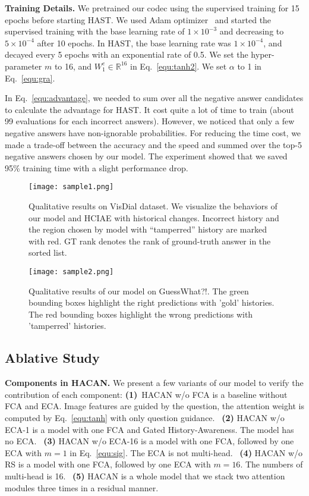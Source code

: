\documentclass[10pt,twocolumn,letterpaper]{article}
\begin{document}
\noindent\textbf{Training Details.} We pretrained our codec using the supervised training for 15 epochs before starting HAST. We used Adam optimizer~\cite{kingma2014adam} and started the supervised training with the base learning rate of $1\!\times\!10^{-3}$ and decreasing to $5\!\times\!10^{-4}$ after 10 epochs. In HAST, the base learning rate was $1\!\times\!10^{-4}$, and decayed every 5 epochs with an exponential rate of 0.5. We set the hyper-parameter $m$ to 16, and $W_{1}^{e} \in \mathbb{R}^{16}$ in Eq.~\eqref{equ:tanh2}. We set $\alpha$ to 1 in Eq.~\eqref{equ:gra}.

In Eq.~\eqref{equ:advantage}, we needed to sum over all the negative answer candidates to calculate the advantage for HAST. It cost quite a lot of time to train (about 99 evaluations for each incorrect answers). However, we noticed that only a few negative answers have non-ignorable probabilities. For reducing the time cost, we made a trade-off between the accuracy and the speed and summed over the top-5 negative answers chosen by our model. The experiment showed that we saved 95\% training time with a slight performance drop.



\begin{figure}[t]
\begin{center}
\texttt{[image: sample1.png]}
\end{center}
   \caption{Qualitative results on VisDial dataset. We visualize the behaviors of our model and HCIAE with historical changes. Incorrect history and the region chosen by model with “tamperred” history are marked with red. GT rank denotes the rank of ground-truth answer in the sorted list.}
\label{fig:sample1}
\end{figure}
\begin{figure}[t]
\begin{center}
\texttt{[image: sample2.png]}
\end{center}
   \caption{Qualitative results of our model on GuessWhat?!. The green bounding boxes highlight the right predictions with ’gold’ histories. The red bounding boxes highlight the wrong predictions with ’tamperred’ histories. }
\label{fig:sample2}
\end{figure}

\subsection{Ablative Study}
\noindent \textbf{Components in HACAN.} We present a few variants of our model to verify the contribution of each component:
\textbf{(1)}~HACAN w/o FCA is a baseline without FCA and ECA. Image features are guided by the question, the attention weight is computed by Eq.~\eqref{equ:tanh} with only question guidance.
~\textbf{(2)} HACAN w/o ECA-1 is a model with one FCA and Gated History-Awareness. The model has no ECA.
~\textbf{(3)} HACAN w/o ECA-16 is a model with one FCA, followed by one ECA with $m=1$ in Eq.~\eqref{equ:sig}. The ECA is not multi-head.
~\textbf{(4)} HACAN w/o RS is a model with one FCA, followed by one ECA with $m=16$. The numbers of multi-head is 16.
~\textbf{(5)} HACAN is a whole model that we stack two attention modules three times in a residual manner.
\end{document}
